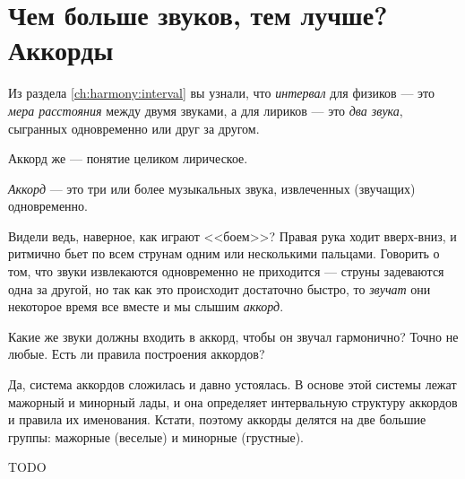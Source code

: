 \section{Чем больше звуков, тем лучше? Аккорды}
\label{ch:harmony:chords}

Из раздела \ref{ch:harmony:interval} вы узнали, что \emph{интервал} для физиков --- это \emph{мера расстояния} между двумя звуками, а для лириков --- это \emph{два звука}, сыгранных одновременно или друг за другом.

Аккорд же --- понятие целиком лирическое.

\begin{Definition}[Аккорд]
    \emph{Аккорд} --- это три или более музыкальных звука, извлеченных (звучащих) одновременно.
\end{Definition}

Видели ведь, наверное, как играют <<боем>>? Правая рука ходит вверх-вниз, и ритмично бьет по всем струнам одним или несколькими пальцами. Говорить о том, что звуки извлекаются одновременно не приходится --- струны задеваются одна за другой, но так как это происходит достаточно быстро, то \emph{звучат} они некоторое время все вместе и мы слышим \emph{аккорд}.

Какие же звуки должны входить в аккорд, чтобы он звучал гармонично? Точно не любые. Есть ли правила построения аккордов?

Да, система аккордов сложилась и давно устоялась. В основе этой системы лежат мажорный и минорный лады, и она определяет интервальную структуру аккордов и правила их именования. Кстати, поэтому аккорды делятся на две большие группы: мажорные (веселые) и минорные (грустные).

TODO






